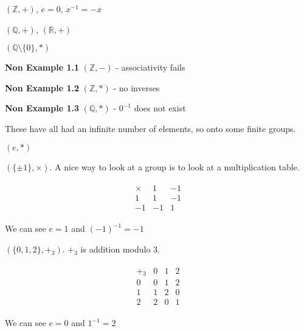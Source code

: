 \begin{example}
\((\mathbb{Z}, +)\), \(e = 0\), \(x^{-1} = -x\)
\end{example}

\begin{example}
\((\mathbb{Q}, +)\), \((\mathbb{R}, +)\)
\end{example}

\begin{example}
\((\mathbb{Q} \setminus \{ 0 \}, *)\)
\end{example}

\textbf{Non Example 1.1} \((\mathbb{Z}, -)\) - associativity fails

\textbf{Non Example 1.2} \((\mathbb{Z}, *)\) - no inverses

\textbf{Non Example 1.3} \((\mathbb{Q}, *)\) - \(0^{-1}\) does not exist

These have all had an infinite number of elements, so onto some finite groups.

\begin{example}
\((e, *)\)
\end{example}

\begin{example}
\((\{\pm 1\}, \times)\). A nice way to look at a group is to look at a multiplication table.

\begin{align*}
    \begin{array}{c|cc}
        \times & 1 & -1 \\
        \hline
        1 & 1 & -1 \\
        -1 & -1 & 1 
    \end{array} 
\end{align*}

We can see \(e = 1\) and \((-1)^{-1} = -1\)
\end{example}

\begin{example}
\((\{0, 1, 2\}, +_3)\). \(+_3\) is addition modulo 3.

\begin{align*}
    \begin{array}{c|ccc}
        +_3 & 0 & 1 & 2 \\
        \hline
        0 & 0 & 1 & 2\\
        1 & 1 & 2 & 0 \\
        2 & 2 & 0 & 1
    \end{array} 
\end{align*}

We can see \(e = 0\) and \(1^{-1} = 2\)
\end{example}

